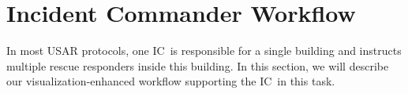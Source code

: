 \documentclass[conference,10pt,letter]{IEEEtran}
\def\IC{IC}
\begin{document}

\section{Incident Commander Workflow} \label{sec:workflow}
%
%
In most USAR protocols, one \IC\ is responsible for a single building and instructs multiple rescue responders inside this building. In this section, we will describe our visualization-enhanced workflow supporting the \IC\ in this task.
\end{document}

